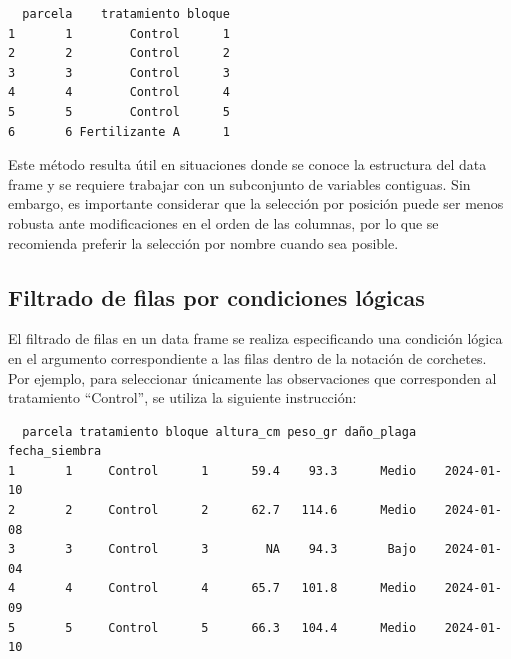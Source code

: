 \documentclass[
  spanish,
  a4paper,
  DIV=11,
  numbers=noendperiod,
  onepage,
  openany]{scrreprt}
\newenvironment{Shaded}{\begin{snugshade}}{\end{snugshade}}
\newcommand{\CommentTok}[1]{\textcolor[rgb]{0.37,0.37,0.37}{#1}}
\newcommand{\FunctionTok}[1]{\textcolor[rgb]{0.28,0.35,0.67}{#1}}
\newcommand{\NormalTok}[1]{\textcolor[rgb]{0.00,0.23,0.31}{#1}}
\newcommand{\OtherTok}[1]{\textcolor[rgb]{0.00,0.23,0.31}{#1}}
\newcommand{\SpecialCharTok}[1]{\textcolor[rgb]{0.37,0.37,0.37}{#1}}
\newcommand{\StringTok}[1]{\textcolor[rgb]{0.13,0.47,0.30}{#1}}
\begin{document}
\begin{verbatim}
  parcela    tratamiento bloque
1       1        Control      1
2       2        Control      2
3       3        Control      3
4       4        Control      4
5       5        Control      5
6       6 Fertilizante A      1
\end{verbatim}

Este método resulta útil en situaciones donde se conoce la estructura
del data frame y se requiere trabajar con un subconjunto de variables
contiguas. Sin embargo, es importante considerar que la selección por
posición puede ser menos robusta ante modificaciones en el orden de las
columnas, por lo que se recomienda preferir la selección por nombre
cuando sea posible.

\subsection{Filtrado de filas por condiciones
lógicas}\label{filtrado-de-filas-por-condiciones-luxf3gicas}

El filtrado de filas en un data frame se realiza especificando una
condición lógica en el argumento correspondiente a las filas dentro de
la notación de corchetes. Por ejemplo, para seleccionar únicamente las
observaciones que corresponden al tratamiento ``Control'', se utiliza la
siguiente instrucción:

\begin{Shaded}
\end{Shaded}

\begin{verbatim}
  parcela tratamiento bloque altura_cm peso_gr daño_plaga fecha_siembra
1       1     Control      1      59.4    93.3      Medio    2024-01-10
2       2     Control      2      62.7   114.6      Medio    2024-01-08
3       3     Control      3        NA    94.3       Bajo    2024-01-04
4       4     Control      4      65.7   101.8      Medio    2024-01-09
5       5     Control      5      66.3   104.4      Medio    2024-01-10
\end{verbatim}
\end{document}
